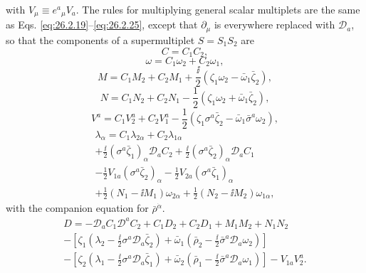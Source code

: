 with \(V_\mu\equiv e^a{}_\mu V_a\). The rules for multiplying general
scalar multiplets are the same as Eqs. \eqref{eq:26.2.19}--\eqref{eq:26.2.25},
except that \(\partial_\mu\) is everywhere replaced with \(\mathcal D_a\),
so that the components of a supermultiplet \(S=S_1S_2\) are
\begin{equation}
  C=C_1C_2,
  \tag{31.6.23}\label{eq:31.6.23}
\end{equation}
\begin{equation}
  \omega=C_1\omega_2+C_2\omega_1,
  \tag{31.6.24}\label{eq:31.6.24}
\end{equation}
\begin{equation}
  M=C_1M_2+C_2M_1+\frac{\ii}{2}
    \left(\zeta_1\omega_2-\bar\omega_1\bar\zeta_2\right),
  \tag{31.6.25}\label{eq:31.6.25}
\end{equation}
\begin{equation}
  N=C_1N_2+C_2N_1-\frac{1}{2}
    \left(\zeta_1\omega_2+\bar\omega_1\bar\zeta_2\right),
  \tag{31.6.26}\label{eq:31.6.26}
\end{equation}
\begin{equation}
  V^a=C_1V_2^a+C_2V_1^a-\frac{1}{2}
    \left(
      \zeta_1\sigma^a\bar\zeta_2
      -\bar\omega_1\bar\sigma^a\omega_2\right),
  \tag{31.6.27}\label{eq:31.6.27}
\end{equation}
\begin{multline}
  \lambda_\alpha
  =C_1\lambda_{2\alpha}+C_2\lambda_{1\alpha}\\
  +\frac{\ii}{2}
    (\sigma^a\bar\zeta_1)_\alpha\mathcal D_aC_2
  +\frac{\ii}{2}
    (\sigma^a\bar\zeta_2)_\alpha\mathcal D_aC_1\\
  -\frac{1}{2}V_{1a}(\sigma^a\bar\zeta_2)_\alpha
  -\frac{1}{2}V_{2a}(\sigma^a\bar\zeta_1)_\alpha\\
  +\frac{1}{2}(N_1-\ii M_1)\omega_{2\alpha}
  +\frac{1}{2}(N_2-\ii M_2)\omega_{1\alpha},
  \tag{31.6.28}\label{eq:31.6.28}
\end{multline}
with the companion equation for \(\bar\rho^{\dot\alpha}\).
\begin{multline}
  D
  =-\mathcal D_aC_1\mathcal D^aC_2
   +C_1D_2+C_2D_1+M_1M_2+N_1N_2\\
  -\left[
    \zeta_1\left(\lambda_2
      -\frac{\ii}{2}\sigma^a\mathcal D_a\bar\zeta_2\right)
    +\bar\omega_1\left(\bar\rho_2
      -\frac{\ii}{2}\bar\sigma^a\mathcal D_a\omega_2\right)
  \right]\\
  -\left[
    \zeta_2\left(\lambda_1
      -\frac{\ii}{2}\sigma^a\mathcal D_a\bar\zeta_1\right)
    +\bar\omega_2\left(\bar\rho_1
      -\frac{\ii}{2}\bar\sigma^a\mathcal D_a\omega_1\right)
  \right]
  -V_{1a}V_2^a.
  \tag{31.6.29}\label{eq:31.6.29}
\end{multline}

